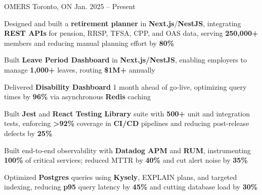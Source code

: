 \documentclass[11pt, a4paper]{awesome-cv}
\begin{document}
\makecvheader[C]


\begin{cventries}


  \cventry
    {\color{lightblue}{ASSOCIATE FULL-STACK ENGINEER}}
    {OMERS}
    {Toronto, ON}
    {Jan. 2025 -- Present}
    {
      \begin{cvitems}
        \item{Designed and built a \textbf{retirement planner} in \textbf{Next.js}/\textbf{NestJS}, integrating \textbf{REST APIs} for pension, RRSP, TFSA, CPP, and OAS data, serving \textbf{250,000+} members and reducing manual planning effort by \textbf{80\%}}
        \item{Built \textbf{Leave Period Dashboard} in \textbf{Next.js/NestJS}, enabling employers to manage \textbf{1,000+} leaves, routing \textbf{\$1M+} annually}
        \item{Delivered \textbf{Disability Dashboard} 1 month ahead of go-live, optimizing query times by \textbf{96\%} via asynchronous \textbf{Redis} caching}
        \item{Built \textbf{Jest} and \textbf{React Testing Library} suite with \textbf{500+} unit and integration tests, enforcing \textbf{>92\%} coverage in \textbf{CI/CD} pipelines and reducing post-release defects by \textbf{25\%}}
        \item{Built end-to-end observability with \textbf{Datadog APM} and \textbf{RUM}, instrumenting \textbf{100\%} of critical services; reduced MTTR by \textbf{40\%} and cut alert noise by \textbf{35\%}}
        \item{Optimized \textbf{Postgres} queries using \textbf{Kysely}, EXPLAIN plans, and targeted indexing, reducing \textbf{p95} query latency by \textbf{45\%} and cutting database load by \textbf{30\%}}
      \end{cvitems}
    }


\end{cventries}
\end{document}
